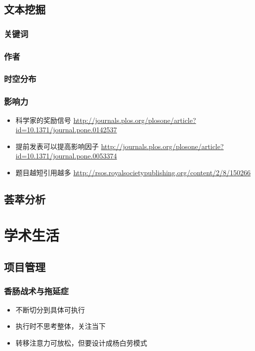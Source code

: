 \documentclass[]{book}
\providecommand{\tightlist}{%
  \setlength{\itemsep}{0pt}\setlength{\parskip}{0pt}}
\begin{document}
\section{文本挖掘}

\subsection{关键词}

\subsection{作者}

\subsection{时空分布}

\subsection{影响力}

\begin{itemize}
\tightlist
\item
  科学家的奖励信号
  \url{http://journals.plos.org/plosone/article?id=10.1371/journal.pone.0142537}
\item
  提前发表可以提高影响因子
  \url{http://journals.plos.org/plosone/article?id=10.1371/journal.pone.0053374}
\item
  题目越短引用越多
  \url{http://rsos.royalsocietypublishing.org/content/2/8/150266}
\end{itemize}

\section{荟萃分析}

\chapter{学术生活}

\section{项目管理}

\subsection{香肠战术与拖延症}

\begin{itemize}
\tightlist
\item
  不断切分到具体可执行
\item
  执行时不思考整体，关注当下
\item
  转移注意力可放松，但要设计成杨白劳模式
\end{itemize}
\end{document}
